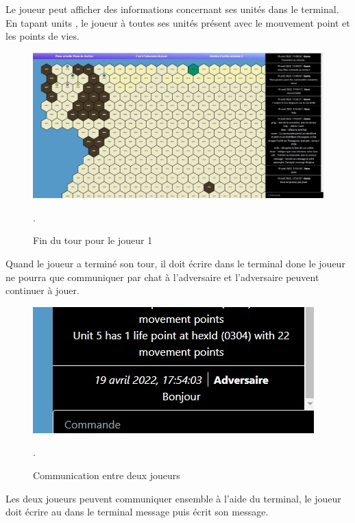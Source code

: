 Le joueur peut afficher des informations concernant ses unités dans le terminal.
En tapant \og units \fg{}, le joueur à toutes ses unités présent avec le mouvement point et  les points de vies.

\begin{figure}[H]
\centering
\includegraphics[scale=0.35]{data/fin_tour.jpg}
\caption{Fin du tour pour le joueur 1}.
\end{figure}

Quand le joueur a terminé son tour, il doit écrire dans le terminal \og done \fg{}
le joueur ne pourra que communiquer par chat à l'adversaire et l'adversaire peuvent continuer à jouer.\\

\begin{figure}[H]
\centering
\includegraphics[scale=0.6]{data/chat.jpg}
\caption{Communication entre deux joueurs}.
\end{figure}
Les deux joueurs peuvent communiquer ensemble  à l'aide du terminal, le joueur doit écrire au dans le terminal \og message \fg{} puis écrit son message.


